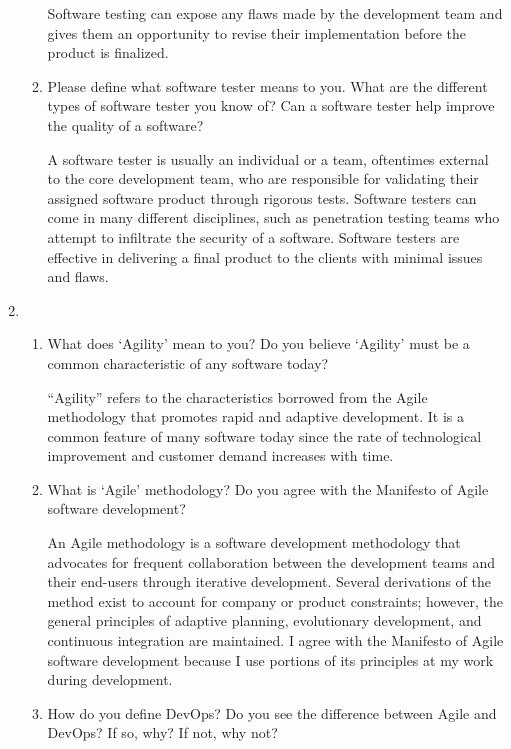 \documentclass[12pt]{article}
\begin{document}
\begin{enumerate}
\begin{enumerate}[start=1,align=left]
      Software testing can expose any flaws made by the development team and gives them an opportunity to revise their implementation before the product is finalized.

      \item Please define what software tester means to you. What are the different types of software tester you know of? Can a software tester help improve the quality of a software?

      A software tester is usually an individual or a team, oftentimes external to the core development team, who are responsible for validating their assigned software product through rigorous tests. Software testers can come in many different disciplines, such as penetration testing teams who attempt to infiltrate the security of a software. Software testers are effective in delivering a final product to the clients with minimal issues and flaws.

    \end{enumerate}

    \item
    \begin{enumerate}[start=1,align=left]

      \item What does ‘Agility’ mean to you? Do you believe ‘Agility’ must be a common characteristic of any software today?

      ``Agility'' refers to the characteristics borrowed from the Agile methodology that promotes rapid and adaptive development. It is a common feature of many software today since the rate of technological improvement and customer demand increases with time.

      \item What is ‘Agile’ methodology? Do you agree with the Manifesto of Agile software development? 

      An Agile methodology is a software development methodology that advocates for frequent collaboration between the development teams and their end-users through iterative development. Several derivations of the method exist to account for company or product constraints; however, the general principles of adaptive planning, evolutionary development, and continuous integration are maintained. I agree with the Manifesto of Agile software development because I use portions of its principles at my work during development.

      \item How do you define DevOps? Do you see the difference between Agile and DevOps? If so, why? If not, why not?


\end{enumerate}
\end{enumerate}
\end{document}
